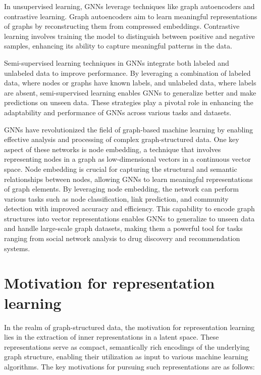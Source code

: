 In unsupervised learning, GNNs leverage techniques like graph autoencoders and contrastive learning. Graph autoencoders aim to learn meaningful representations of graphs by reconstructing them from compressed embeddings. Contrastive learning involves training the model to distinguish between positive and negative samples, enhancing its ability to capture meaningful patterns in the data.

Semi-supervised learning techniques in GNNs integrate both labeled and unlabeled data to improve performance. By leveraging a combination of labeled data, where nodes or graphs have known labels, and unlabeled data, where labels are absent, semi-supervised learning enables GNNs to generalize better and make predictions on unseen data. \cite{DBLP:journals/corr/KipfW16} These strategies play a pivotal role in enhancing the adaptability and performance of GNNs across various tasks and datasets.

GNNs have revolutionized the field of graph-based machine learning by enabling effective analysis and processing of complex graph-structured data. One key aspect of these networks is node embedding, a technique that involves representing nodes in a graph as low-dimensional vectors in a continuous vector space. Node embedding is crucial for capturing the structural and semantic relationships between nodes, allowing GNNs to learn meaningful representations of graph elements. By leveraging node embedding, the network can perform various tasks such as node classification, link prediction, and community detection with improved accuracy and efficiency. This capability to encode graph structures into vector representations enables GNNs to generalize to unseen data and handle large-scale graph datasets, making them a powerful tool for tasks ranging from social network analysis to drug discovery and recommendation systems.


\section{Motivation for representation learning}

In the realm of graph-structured data, the motivation for representation learning lies in the extraction of inner representations in a latent space. These representations serve as compact, semantically rich encodings of the underlying graph structure, enabling their utilization as input to various machine learning algorithms. The key motivations for pursuing such representations are as follows: \cite{DBLP:journals/corr/abs-1709-05584}

